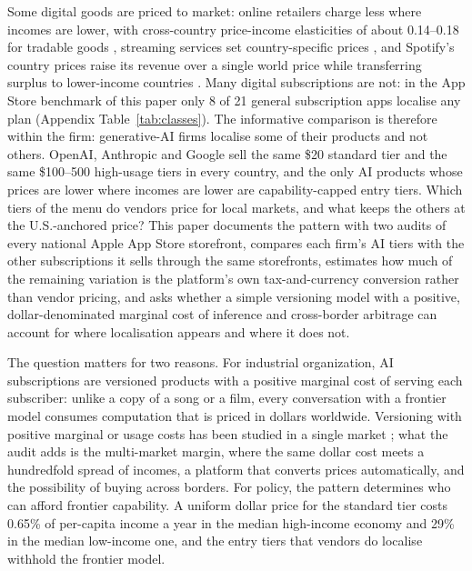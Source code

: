 \documentclass[11pt]{article}
\theoremstyle{definition}
\theoremstyle{remark}
\begin{document}
Some digital goods are priced to market: online retailers charge less where incomes are lower, with cross-country price-income elasticities of about 0.14--0.18 for tradable goods \citep{simonovska2015income}, streaming services set country-specific prices \citep{colbjornsen2022what}, and Spotify's country prices raise its revenue over a single world price while transferring surplus to lower-income countries \citep{waldfogel2020spotify}. Many digital subscriptions are not: in the App Store benchmark of this paper only 8 of 21 general subscription apps localise any plan (Appendix Table~\ref{tab:classes}). The informative comparison is therefore within the firm: generative-AI firms localise some of their products and not others. OpenAI, Anthropic and Google sell the same \$20 standard tier and the same \$100--500 high-usage tiers in every country, and the only AI products whose prices are lower where incomes are lower are capability-capped entry tiers. Which tiers of the menu do vendors price for local markets, and what keeps the others at the U.S.-anchored price? This paper documents the pattern with two audits of every national Apple App Store storefront, compares each firm's AI tiers with the other subscriptions it sells through the same storefronts, estimates how much of the remaining variation is the platform's own tax-and-currency conversion rather than vendor pricing, and asks whether a simple versioning model with a positive, dollar-denominated marginal cost of inference and cross-border arbitrage can account for where localisation appears and where it does not.

The question matters for two reasons. For industrial organization, AI subscriptions are versioned products with a positive marginal cost of serving each subscriber: unlike a copy of a song or a film, every conversation with a frontier model consumes computation that is priced in dollars worldwide. Versioning with positive marginal or usage costs has been studied in a single market \citep{jones2011information,chellappa2018cost}; what the audit adds is the multi-market margin, where the same dollar cost meets a hundredfold spread of incomes, a platform that converts prices automatically, and the possibility of buying across borders. For policy, the pattern determines who can afford frontier capability. A uniform dollar price for the standard tier costs 0.65\% of per-capita income a year in the median high-income economy and 29\% in the median low-income one, and the entry tiers that vendors do localise withhold the frontier model.
\end{document}
